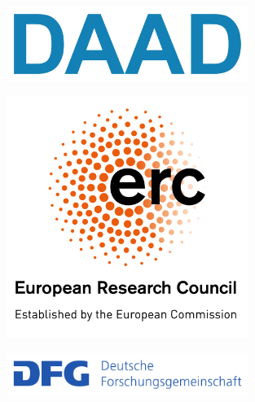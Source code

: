 \documentclass{hyconsys-presentation}
\begin{document}
\begin{frame}
\begin{columns}
			\begin{column}{0.35\textwidth}				
				\vspace{-5em}				
				\begin{figure}
					\centering
					\includegraphics[width=0.7\textwidth]{figures/DAAD_logo.png}
				\end{figure}	
				\begin{figure}
					\centering
					\includegraphics[width=0.7\textwidth]{figures/ERC_logo.png}
				\end{figure}
				\begin{figure}
					\centering
					\includegraphics[width=0.7\textwidth]{figures/DFG_logo.png}
				\end{figure}			
			\end{column}
		\end{columns}							
	\end{frame}
\end{document}

